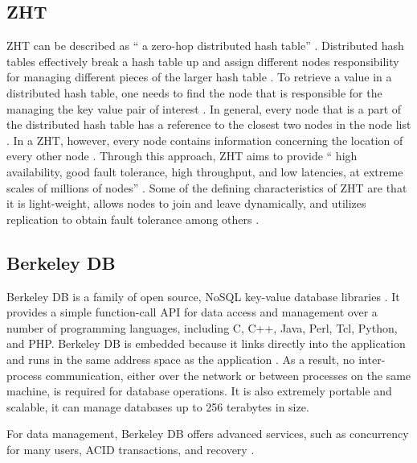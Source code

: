 {     \pv

\subsection{ZHT}

     ZHT can be described as  `` a zero-hop distributed hash
     table'' \cite{datasys}. Distributed hash tables effectively break a hash table up
     and assign different nodes responsibility for managing different
     pieces of the larger hash table \cite{wiley}. To retrieve a
     value in a distributed hash table, one needs to find the node
     that is responsible for the managing the key value pair of
     interest \cite{wiley}. In general, every node that is a part of
     the distributed hash table has a reference to the closest two
     nodes in the node list \cite{wiley}. In a ZHT, however, every
     node contains information concerning the location of every other
     node \cite{Li}. Through this approach, ZHT aims to provide `` high
     availability, good fault tolerance, high throughput, and low
     latencies, at extreme scales of millions of nodes'' \cite{Li}.
     Some of the defining characteristics of ZHT are that it is
     light-weight, allows nodes to join and leave dynamically, and
     utilizes replication to obtain fault tolerance among
     others \cite{Li}.

     \pv
     
\subsection{Berkeley DB}

     Berkeley DB is a family of open source, NoSQL key-value database
     libraries \cite{www-bdb-wiki}. It provides a simple
     function-call API for data access and management over a number of
     programming languages, including C, C++, Java, Perl, Tcl, Python,
     and PHP. Berkeley DB is embedded because it links directly into
     the application and runs in the same address space as the
     application \cite{www-bdb-stanford}. As a result, no
     inter-process communication, either over the network or between
     processes on the same machine, is required for database
     operations. It is also extremely portable and scalable, it can
     manage databases up to 256 terabytes in size.
     
     For data management, Berkeley DB offers advanced
     services, such as concurrency for many users, ACID transactions,
     and recovery \cite{www-bdb}.
     
}
